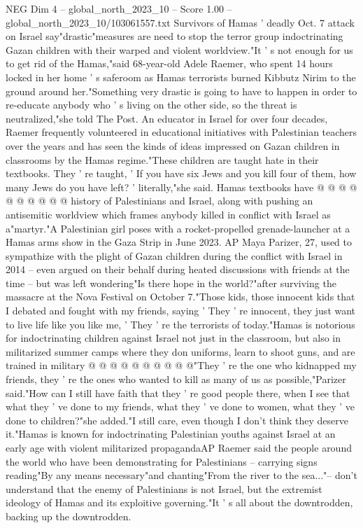 \begin{textsample}{NEG Dim 4 – global\_north\_2023\_10 – Score 1.00 – global\_north\_2023\_10/103061557.txt}  \label{ex:f4_neg_014}
Survivors of Hamas ' deadly Oct. 7 attack on Israel say"drastic"measures are need to stop the terror group indoctrinating Gazan children with their warped and violent worldview."It ' s not enough for us to get rid of the Hamas,"said 68-year-old Adele Raemer, who spent 14 hours locked in her home ' s saferoom as Hamas terrorists burned Kibbutz Nirim to the ground around her."Something very drastic is going to have to happen in order to re-educate anybody who ' s living on the other side, so the threat is neutralized,"she told The Post.
An educator in Israel for over four decades, Raemer frequently volunteered in educational initiatives with Palestinian teachers over the years and has seen the kinds of ideas impressed on Gazan children in classrooms by the Hamas regime."These children are taught hate in their textbooks.
They ' re taught, ' If you have six Jews and you kill four of them, how many Jews do you have left? ' literally,"she said.
Hamas textbooks have @ @ @ @ @ @ @ @ @ @ history of Palestinians and Israel, along with pushing an antisemitic worldview which frames anybody killed in conflict with Israel as a"martyr."A Palestinian girl poses with a rocket-propelled grenade-launcher at a Hamas arms show in the Gaza Strip in June 2023.
AP Maya Parizer, 27, used to sympathize with the plight of Gazan children during the conflict with Israel in 2014 -- even argued on their behalf during heated discussions with friends at the time -- but was left wondering"Is there hope in the world?"after surviving the massacre at the Nova Festival on October 7."Those kids, those innocent kids that I debated and fought with my friends, saying ' They ' re innocent, they just want to live life like you like me, ' They ' re the terrorists of today."Hamas is notorious for indoctrinating children against Israel not just in the classroom, but also in militarized summer camps where they don uniforms, learn to shoot guns, and are trained in military @ @ @ @ @ @ @ @ @ @"They ' re the one who kidnapped my friends, they ' re the ones who wanted to kill as many of us as possible,"Parizer said."How can I still have faith that they ' re good people there, when I see that what they ' ve done to my friends, what they ' ve done to women, what they ' ve done to children?"she added."I still care, even though I don't think they deserve it."Hamas is known for indoctrinating Palestinian youths against Israel at an early age with violent militarized propagandaAP Raemer said the people around the world who have been demonstrating for Palestinians -- carrying signs reading"By any means necessary"and chanting"From the river to the sea..."-- don't understand that the enemy of Palestinians is not Israel, but the extremist ideology of Hamas and its exploitive governing."It ' s all about the downtrodden, backing up the downtrodden.

\end{textsample}
